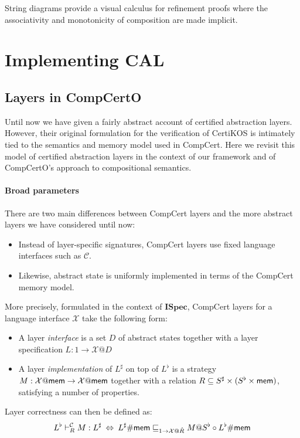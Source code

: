 \documentclass[acmsmall,review,anonymous]{acmart}\settopmatter{printfolios=true,printccs=false,printacmref=false}
\newcommand{\ISpec}{\mathbf{ISpec}}
\begin{document}
String diagrams
provide a visual calculus for refinement proofs where
the associativity and monotonicity of composition
are made implicit.




\section{Implementing CAL}

\subsection{Layers in CompCertO} %
\label{sec:cal:compcerto}

Until now we have given a fairly abstract account of
certified abstraction layers.
However, their original formulation
for the verification of CertiKOS \cite{popl15}
is intimately tied to the semantics and memory model
used in CompCert.
Here we revisit this model of certified abstraction layers
in the context of our framework and
of CompCertO's approach to compositional semantics.

\paragraph{Broad parameters} %

There are two main differences between
CompCert layers and
the more abstract layers
we have considered until now:
\begin{itemize}
  \item Instead of layer-specific signatures,
    CompCert layers use fixed language interfaces
    such as $\mathcal{C}$.
  \item Likewise, abstract state is uniformly implemented
    in terms of the CompCert memory model.
\end{itemize}
More precisely,
formulated in the context of $\ISpec$,
CompCert layers for a language interface $\mathcal{X}$
take the following form:
\begin{itemize}
  \item A layer \emph{interface}
    is a set $D$ of abstract states
    together with a layer specification
    $L : 1 \rightarrow \mathcal{X}@D$
  \item A layer \emph{implementation}
    of $L^\sharp$ on top of $L^\flat$
    is a strategy
    $M : \mathcal{X}@ \mathsf{mem}  \rightarrow \mathcal{X}@ \mathsf{mem} $
    together with a relation
    $R \subseteq S^\sharp \times (S^\flat \times  \mathsf{mem} )$,
    satisfying a number of properties.
\end{itemize}
Layer correctness can then be defined as:
\[
  L^\flat \vdash_R^\mathcal{C} M : L^\sharp
  \:\Leftrightarrow\:
  L^\sharp \# \mathsf{mem}  \sqsubseteq_{1 \rightarrow \mathcal{X}@\hat{R}}
  M@S^\flat \circ L^\flat \# \mathsf{mem} 
\]
\end{document}
